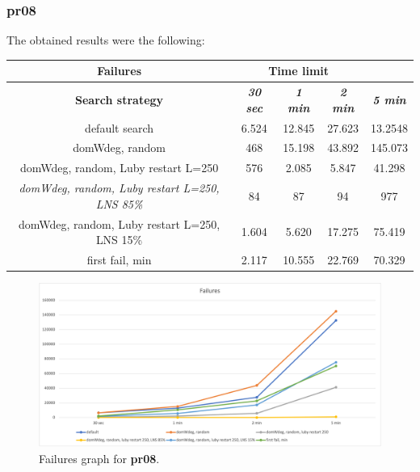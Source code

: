 \subsubsection{pr08}
The obtained results were the following:
{
\renewcommand{\arraystretch}{2}
\begin{longtable}[h]{| c | c | c | c | c |}
    \hline
    \textbf{Failures} & \multicolumn{3}{c}{Time limit} & \\
    \hline
    \textbf{Search strategy} & \textbf{\textit{30 sec}} & \textbf{\textit{1 min}} & \textbf{\textit{2 min}} & \textbf{\textit{5 min}} \\
    \hline
    \endhead
    default search                                         & 6.524 & 12.845 &  27.623 & 13.2548 \\
    \hline
    domWdeg, random                                        &  468 & 15.198 &  43.892 & 145.073 \\
    \hline
    domWdeg, random, Luby restart L=250                    &  576 &  2.085 &   5.847 &  41.298 \\
    \hline
    \textit{domWdeg, random, Luby restart L=250, LNS 85\%} &   84 &    87 &     94 &    977 \\
    \hline
    domWdeg, random, Luby restart L=250, LNS 15\%          & 1.604 &  5.620 &  17.275 &  75.419 \\
    \hline
    first fail, min                                        & 2.117 & 10.555 &  22.769 &  70.329 \\
    \hline
\end{longtable}
}
\begin{figure}[H]
    \centering
    \includegraphics[width=0.8\columnwidth]{../graphs/pr08-failures.png}
    \caption{Failures graph for \textbf{pr08}.}
\end{figure}

